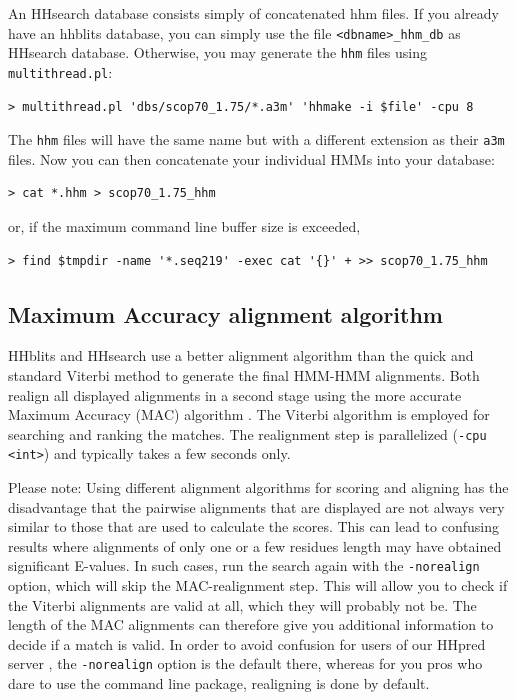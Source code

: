\documentclass[11pt,a4paper]{article}
\begin{document}
An HHsearch database consists simply of concatenated hhm files. If you already have an hhblits database, you can simply use the file \verb`<dbname>_hhm_db` as HHsearch database. Otherwise, you may generate the \verb`hhm` files using \verb`multithread.pl`:
\begin{verbatim}
> multithread.pl 'dbs/scop70_1.75/*.a3m' 'hhmake -i $file' -cpu 8 
\end{verbatim}
The \verb`hhm` files will have the same name but with a different extension as their \verb`a3m` files. Now you 
can then concatenate your individual HMMs into your database:
\begin{verbatim}
> cat *.hhm > scop70_1.75_hhm
\end{verbatim}
or, if the maximum command line buffer size is exceeded, 
\begin{verbatim}
> find $tmpdir -name '*.seq219' -exec cat '{}' + >> scop70_1.75_hhm
\end{verbatim}


\subsection{Maximum Accuracy alignment algorithm} \label{MAC}

HHblits and HHsearch use a better alignment algorithm than the quick and 
standard Viterbi method to generate the final HMM-HMM alignments. Both realign
all displayed alignments in a second stage using the more accurate Maximum Accuracy 
(MAC) algorithm \cite{Durbin:2008,Biegert:2008}. The Viterbi algorithm is employed 
for searching and ranking the matches. The realignment step is parallelized 
(\verb`-cpu <int>`) and typically takes a few seconds only.    

Please note: Using different alignment algorithms for scoring and aligning has the 
disadvantage that the pairwise alignments that are displayed are not always very similar to 
those that are used to calculate the scores. This can lead to confusing results 
where alignments of only one or a few residues length may have obtained significant
E-values. In such cases, run the search again with the \verb`-norealign` option, which will 
skip the MAC-realignment step. This will allow you to check if the Viterbi alignments 
are valid at all, which they will probably not be. The length of the MAC alignments 
can therefore give you additional information to decide if a match is valid. In order
to avoid confusion for users of our HHpred server \cite{Soding:2005b, Hildebrand:2009}, 
the \verb`-norealign` option is the default there, whereas for you pros who dare to use 
the command line package, realigning is done by default.
\end{document}
